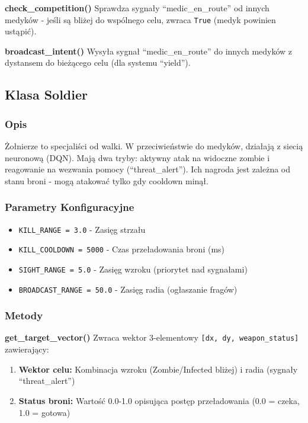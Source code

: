 \documentclass[12pt,a4paper]{article}
\begin{document}
\textbf{check\_competition()}
Sprawdza sygnały ``medic\_en\_route'' od innych medyków - jeśli są bliżej do wspólnego celu, zwraca \texttt{True} (medyk powinien ustąpić).

\textbf{broadcast\_intent()}
Wysyła sygnał ``medic\_en\_route'' do innych medyków z dystansem do bieżącego celu (dla systemu ``yield'').

\subsection{Klasa Soldier}

\subsubsection{Opis}
Żołnierze to specjaliści od walki. W przeciwieństwie do medyków, działają z siecią neuronową (DQN). Mają dwa tryby: aktywny atak na widoczne zombie i reagowanie na wezwania pomocy (``threat\_alert''). Ich nagroda jest zależna od stanu broni - mogą atakować tylko gdy cooldown minął.

\subsubsection{Parametry Konfiguracyjne}
\begin{itemize}
	\item \texttt{KILL\_RANGE = 3.0} - Zasięg strzału
	\item \texttt{KILL\_COOLDOWN = 5000} - Czas przeładowania broni (ms)
	\item \texttt{SIGHT\_RANGE = 5.0} - Zasięg wzroku (priorytet nad sygnałami)
	\item \texttt{BROADCAST\_RANGE = 50.0} - Zasięg radia (ogłaszanie fragów)
\end{itemize}

\subsubsection{Metody}

\textbf{get\_target\_vector()}
Zwraca wektor 3-elementowy \texttt{[dx, dy, weapon\_status]} zawierający:
\begin{enumerate}
	\item \textbf{Wektor celu:} Kombinacja wzroku (Zombie/Infected bliżej) i radia (sygnały ``threat\_alert'')
	\item \textbf{Status broni:} Wartość 0.0-1.0 opisująca postęp przeładowania (0.0 = czeka, 1.0 = gotowa)
\end{enumerate}
\end{document}
